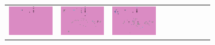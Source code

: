 \documentclass{ipol}
\begin{document}
\begin{figure}[ht]
\begin{subfigure}[t]{\linewidth}
\begin{tabular}{ccccccccc}
                \includegraphics[width=\s]{images/carnival/LINEAR/iso_64_grids.png}&
                \includegraphics[width=\s]{images/carnival/PPG/iso_64_grids.png}&
                \includegraphics[width=\s]{images/carnival/VNG/iso_64_grids.png}\\

\end{tabular}
\end{subfigure}
\end{figure}
\end{document}
